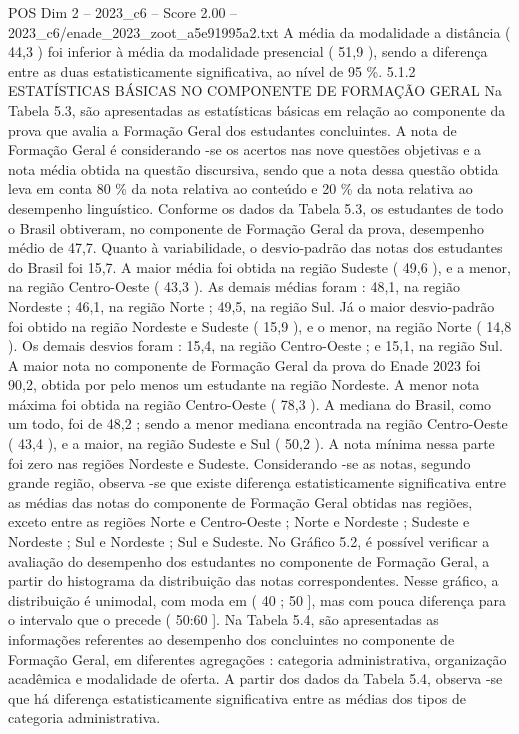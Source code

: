 \begin{textsample}{POS Dim 2 – 2023\_c6 – Score 2.00 – 2023\_c6/enade\_2023\_zoot\_a5e91995a2.txt}
A média da modalidade a distância ( 44,3 ) foi inferior à média da modalidade presencial ( 51,9 ), sendo a diferença entre as duas estatisticamente significativa, ao nível de 95 \%. 5.1.2 ESTATÍSTICAS BÁSICAS NO COMPONENTE DE FORMAÇÃO GERAL Na Tabela 5.3, são apresentadas as estatísticas básicas em relação ao componente da prova que avalia a Formação Geral dos estudantes concluintes.
A nota de Formação Geral é considerando -se os acertos nas nove questões objetivas e a nota média obtida na questão discursiva, sendo que a nota dessa questão obtida leva em conta 80 \% da nota relativa ao conteúdo e 20 \% da nota relativa ao desempenho linguístico.
Conforme os dados da Tabela 5.3, os estudantes de todo o Brasil obtiveram, no componente de Formação Geral da prova, desempenho médio de 47,7.
Quanto à variabilidade, o desvio-padrão das notas dos estudantes do Brasil foi 15,7.
A maior média foi obtida na região Sudeste ( 49,6 ), e a menor, na região Centro-Oeste ( 43,3 ).
As demais médias foram : 48,1, na região Nordeste ; 46,1, na região Norte ; 49,5, na região Sul.
Já o maior desvio-padrão foi obtido na região Nordeste e Sudeste ( 15,9 ), e o menor, na região Norte ( 14,8 ).
Os demais desvios foram : 15,4, na região Centro-Oeste ; e 15,1, na região Sul.
A maior nota no componente de Formação Geral da prova do Enade 2023 foi 90,2, obtida por pelo menos um estudante na região Nordeste.
A menor nota máxima foi obtida na região Centro-Oeste ( 78,3 ).
A mediana do Brasil, como um todo, foi de 48,2 ; sendo a menor mediana encontrada na região Centro-Oeste ( 43,4 ), e a maior, na região Sudeste e Sul ( 50,2 ).
A nota mínima nessa parte foi zero nas regiões Nordeste e Sudeste.
Considerando -se as notas, segundo grande região, observa -se que existe diferença estatisticamente significativa entre as médias das notas do componente de Formação Geral obtidas nas regiões, exceto entre as regiões Norte e Centro-Oeste ; Norte e Nordeste ; Sudeste e Nordeste ; Sul e Nordeste ; Sul e Sudeste.
No Gráfico 5.2, é possível verificar a avaliação do desempenho dos estudantes no componente de Formação Geral, a partir do histograma da distribuição das notas correspondentes.
Nesse gráfico, a distribuição é unimodal, com moda em ( 40 ; 50 ], mas com pouca diferença para o intervalo que o precede ( 50:60 ].
Na Tabela 5.4, são apresentadas as informações referentes ao desempenho dos concluintes no componente de Formação Geral, em diferentes agregações : categoria administrativa, organização acadêmica e modalidade de oferta.
A partir dos dados da Tabela 5.4, observa -se que há diferença estatisticamente significativa entre as médias dos tipos de categoria administrativa.

\end{textsample}
